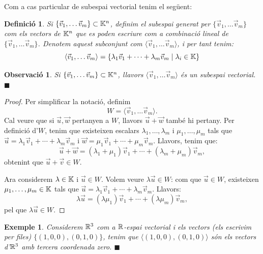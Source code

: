 \documentclass[
  11pt,
]{book}
\numberwithin{dummy}{section}
\theoremstyle{maincolornumbox}
\newtheorem{remarkT}{Observació}[chapter]
\theoremstyle{blacknumex}
\newtheorem{exampleT}{Exemple}[chapter]
\theoremstyle{blacknumbox}
\newtheorem{definitionT}{Definició}[chapter]
\theoremstyle{maincolornum}
\newenvironment{definition}{\begin{dBox}\begin{definitionT}}{\end{definitionT}\end{dBox}}
\newenvironment{example}{\begin{exampleT}}{\hfill{\tiny\ensuremath{\blacksquare}}\end{exampleT}}
\newenvironment{remark}{\begin{remarkT}}{\hfill{\tiny\ensuremath{\blacksquare}}\end{remarkT}}
\newlength\esp
\begin{document}
Com a cas particular de subespai vectorial tenim el següent:

\begin{definition}
\protect\hypertarget{def:subespaigenerat}{}\label{def:subespaigenerat}Si
\(\{\vec v_1, \dots \vec v_m\}\subset \mathbb{K}^n\), definim el \emph{subespai generat
per \(\{\vec v_1, \dots \vec v_m\}\)} com els vectors de \(\mathbb{K}^n\) que es
poden escriure com a combinació lineal de
\(\{\vec v_1, \dots \vec v_m\}\). Denotem aquest subconjunt com
\(\langle \vec v_1, \dots \vec v_m \rangle\), i per tant tenim:
\[\langle \vec v_1, \dots \vec v_m \rangle = \{\lambda_1 \vec v_1 + \cdots + \lambda_m\vec v_m \mid \lambda_i\in\mathbb{K} \}\]
\end{definition}

\begin{remark}
Si \(\{\vec v_1, \dots \vec v_m\}\subset \mathbb{K}^n\), llavors
\(\langle \vec v_1, \dots \vec v_m \rangle\) és un subespai vectorial.
\end{remark}

\begin{proof}
Per simplificar la notació, definim
\[W=\langle \vec v_1, \dots \vec v_m \rangle .\] Cal veure que si
\(\vec u, \vec w\) pertanyen a \(W\), llavors \(\vec u+\vec w\) també hi
pertany. Per definició d'\(W\), tenim que existeixen escalars
\(\lambda_1, \dots ,\lambda_m\) i \(\mu_1,\dots,\mu_m\) tals que
\(\vec u= \lambda_1 \vec v_1+\cdots +\lambda_m\vec v_m\) i
\(\vec w=\mu_1\vec v_1+\cdots +\mu_m\vec v_m\). Llavors, tenim que:
\[\vec u+\vec w = (\lambda_1+\mu_1)\vec v_1 + \cdots + (\lambda_m+\mu_m)\vec v_m ,\]
obtenint que \(\vec u+\vec v \in W\).

Ara considerem \(\lambda \in \mathbb{K}\) i \(\vec u\in W\). Volem veure
\(\lambda \vec u \in W\): com que \(\vec u\in W\), existeixen
\(\mu_1, \dots , \mu_m\in\mathbb{K}\) tals que
\(\vec u=\lambda_1\vec v_1 + \cdots + \lambda_m\vec v_m\). Llavors:
\[\lambda \vec u = (\lambda \mu_1)\vec v_1 + \cdots + (\lambda \mu_m)\vec v_m ,\]
pel que \(\lambda \vec u \in W\).
\end{proof}

\begin{example}
Considerem \(\mathbb{R}^3\) com a \(\mathbb{R}\)-espai vectorial i els vectors (els escrivim
per files) \(\{(1,0,0),(0,1,0)\}\), tenim que
\(\langle (1,0,0),(0,1,0)\rangle\) són els vectors d'\(\mathbb{R}^3\) amb tercera
coordenada zero.
\end{example}
\end{document}
